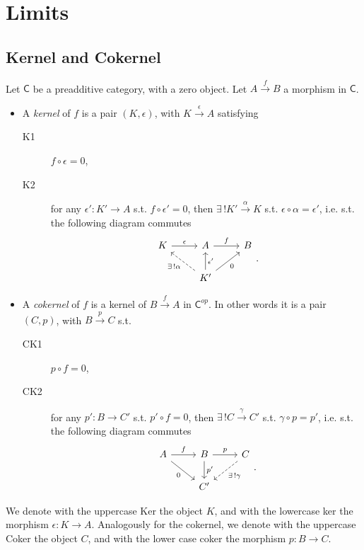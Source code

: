 \section{Limits}
\subsection{Kernel and Cokernel}

\begin{defn}[(Co)kernel]
	Let $\mathsf{C}$ be a preadditive category, with a zero object.
	Let $A \xrightarrow{f} B$ a morphism in $\mathsf{C}$.
	\begin{itemize}
		\item A {\em kernel} of $f$ is a pair $\left(K, \epsilon\right)$, with $K \xrightarrow{\epsilon} A$ satisfying
	\begin{description}
		\item[K1] $f \circ \epsilon = 0$,
		\item[K2] for any $\epsilon': K' \to A$ s.t. $f \circ \epsilon' = 0$, then
			$\exists\, ! K' \xrightarrow{\alpha} K$ s.t. $\epsilon \circ \alpha = \epsilon'$, i.e. s.t. the following diagram commutes
			\begin{equation}
			\begin{tikzcd}
				K \arrow[r, "\epsilon", rightarrow] & A \arrow[r, "f", rightarrow] & B\\
				    & K' \arrow[lu, "\exists\, ! \alpha", dashrightarrow] \arrow[u, "\epsilon'"', rightarrow] \arrow[ru, "0"', rightarrow] & 
			\end{tikzcd}
			.\end{equation} 
	\end{description} 
	\item A {\em cokernel} of $f$ is a kernel of $B \xrightarrow{f} A$ in $\mathsf{C}^{op}$.
		In other words it is a pair $\left(C, p\right)$, with $B \xrightarrow{p} C$ s.t.
	\begin{description}
		\item[CK1] $p \circ f = 0$,
		\item[CK2] for any $p': B \to C'$ s.t. $p' \circ f = 0$, then
			$\exists\, ! C \xrightarrow{\gamma} C'$ s.t. $\gamma \circ p = p'$, i.e. s.t. the following diagram commutes
			\begin{equation}
			\begin{tikzcd}
				A \arrow[r, "f", rightarrow] \arrow[rd, "0"', rightarrow]  & B \arrow[r, "p", rightarrow] \arrow[d, "p'", rightarrow] & C \arrow[ld, "\exists\, ! \gamma", dashrightarrow] \\
				    & C'& 
			\end{tikzcd}
			.\end{equation} 
	\end{description} 
	\end{itemize}
	We denote with the uppercase Ker the object $K$, and with the lowercase ker the morphism $\epsilon: K \to A$.\newline
	Analogously for the cokernel, we denote with the uppercase Coker the object $C$, and with the lower case coker the morphism $p: B \to C$.
\end{defn}

